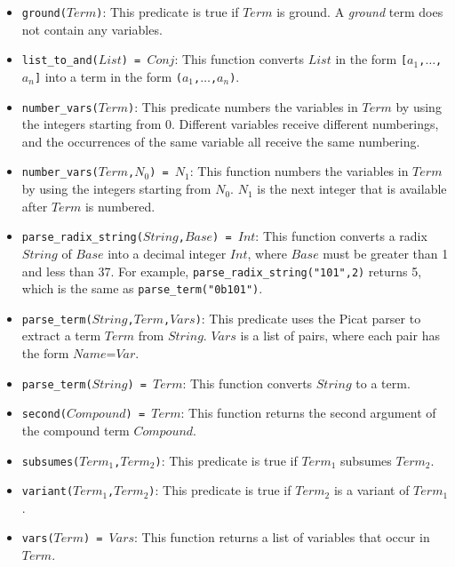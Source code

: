 \begin{itemize}
\item \texttt{ground($Term$)}: This predicate is true if $Term$ is ground.  A \emph{ground} term does not contain any variables.
\item \texttt{list\_to\_and($List$) = $Conj$}: This function converts $List$ in the form \texttt{[$a_1$,$\ldots$,$a_n$]} into a term in the form \texttt{($a_1$,$\ldots$,$a_n$)}.
\item \texttt{number\_vars($Term$)}: This predicate numbers the variables in $Term$ by using the integers starting from 0. Different variables receive different numberings, and the occurrences of the same variable all receive the same numbering.
\item \texttt{number\_vars($Term$,$N_0$) = $N_1$}: This function numbers the variables in $Term$ by using the integers starting from $N_0$.  $N_1$ is the next integer that is available after $Term$ is numbered.  
\item \texttt{parse\_radix\_string($String$,$Base$) = $Int$}: This function converts a radix $String$ of $Base$ into a decimal integer $Int$, where $Base$ must be greater than 1 and less than 37. For example, \texttt{parse\_radix\_string("101",2)} returns 5, which is the same as \texttt{parse\_term("0b101")}.
\item \texttt{parse\_term($String$,$Term$,$Vars$)}: This predicate uses the Picat parser to extract a term $Term$ from $String$. $Vars$ is a list of pairs, where each pair has the form $Name$=$Var$. 
\item \texttt{parse\_term($String$) = $Term$}: This function converts $String$ to a term.
\item \texttt{second($Compound$) = $Term$}: This function returns the second argument of the compound term $Compound$.  
\item \texttt{subsumes($Term_1$,$Term_2$)}: This predicate is true if $Term_1$ subsumes $Term_2$.
\item \texttt{variant($Term_1$,$Term_2$)}: This predicate is true if $Term_2$ is a variant of $Term_1$.
\item \texttt{vars($Term$) = $Vars$}: This function returns a list of variables that occur in $Term$.
\end{itemize}
\ignore{

}
